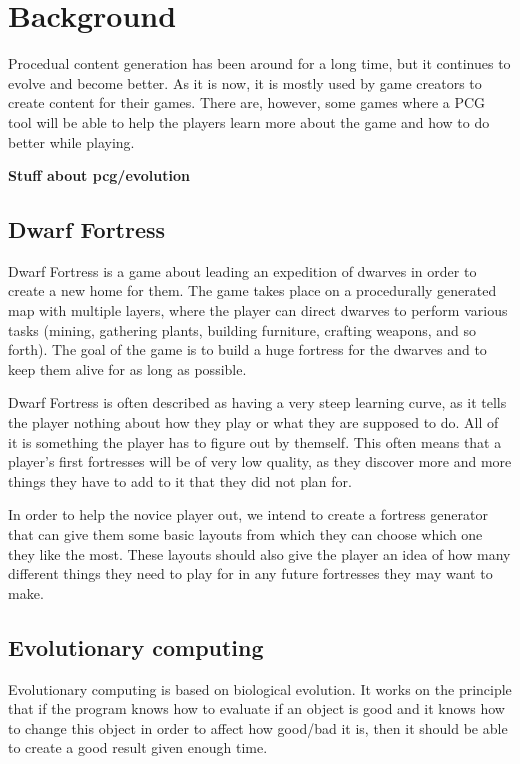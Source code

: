 \section{Background}
\label{02}

Procedual content generation has been around for a long time, but it continues to evolve and become better. As it is now, it is mostly used by game creators to create content for their games. There are, however, some games where a PCG tool will be able to help the players learn more about the game and how to do better while playing.

\textbf{Stuff about pcg/evolution}

\subsection{Dwarf Fortress}

Dwarf Fortress is a game about leading an expedition of dwarves in order to create a new home for them. The game takes place on a procedurally generated map with multiple layers, where the player can direct dwarves to perform various tasks (mining, gathering plants, building furniture, crafting weapons, and so forth). The goal of the game is to build a huge fortress for the dwarves and to keep them alive for as long as possible.

Dwarf Fortress is often described as having a very steep learning curve, as it tells the player nothing about how they play or what they are supposed to do. All of it is something the player has to figure out by themself. This often means that a player's first fortresses will be of very low quality, as they discover more and more things they have to add to it that they did not plan for.

In order to help the novice player out, we intend to create a fortress generator that can give them some basic layouts from which they can choose which one they like the most. These layouts should also give the player an idea of how many different things they need to play for in any future fortresses they may want to make.


\subsection{Evolutionary computing}
\label{02_Evolution}

Evolutionary computing\cite[Chapter 2]{IoEC} is based on biological evolution. It works on the principle that if the program knows how to evaluate if an object is good and it knows how to change this object in order to affect how good/bad it is, then it should be able to create a good result given enough time.

